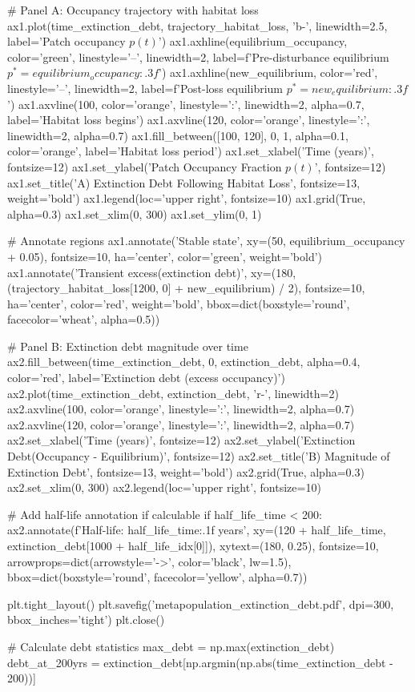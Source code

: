 \documentclass[11pt,a4paper]{article}
\begin{document}
\begin{pycode}
# Panel A: Occupancy trajectory with habitat loss
ax1.plot(time_extinction_debt, trajectory_habitat_loss, 'b-', linewidth=2.5, label='Patch occupancy $p(t)$')
ax1.axhline(equilibrium_occupancy, color='green', linestyle='--', linewidth=2,
           label=f'Pre-disturbance equilibrium $p^* = {equilibrium_occupancy:.3f}$')
ax1.axhline(new_equilibrium, color='red', linestyle='--', linewidth=2,
           label=f'Post-loss equilibrium $p^* = {new_equilibrium:.3f}$')
ax1.axvline(100, color='orange', linestyle=':', linewidth=2, alpha=0.7,
           label='Habitat loss begins')
ax1.axvline(120, color='orange', linestyle=':', linewidth=2, alpha=0.7)
ax1.fill_between([100, 120], 0, 1, alpha=0.1, color='orange', label='Habitat loss period')
ax1.set_xlabel('Time (years)', fontsize=12)
ax1.set_ylabel('Patch Occupancy Fraction $p(t)$', fontsize=12)
ax1.set_title('A) Extinction Debt Following Habitat Loss', fontsize=13, weight='bold')
ax1.legend(loc='upper right', fontsize=10)
ax1.grid(True, alpha=0.3)
ax1.set_xlim(0, 300)
ax1.set_ylim(0, 1)

# Annotate regions
ax1.annotate('Stable state', xy=(50, equilibrium_occupancy + 0.05),
            fontsize=10, ha='center', color='green', weight='bold')
ax1.annotate('Transient excess\n(extinction debt)',
            xy=(180, (trajectory_habitat_loss[1200, 0] + new_equilibrium) / 2),
            fontsize=10, ha='center', color='red', weight='bold',
            bbox=dict(boxstyle='round', facecolor='wheat', alpha=0.5))

# Panel B: Extinction debt magnitude over time
ax2.fill_between(time_extinction_debt, 0, extinction_debt, alpha=0.4, color='red',
                label='Extinction debt (excess occupancy)')
ax2.plot(time_extinction_debt, extinction_debt, 'r-', linewidth=2)
ax2.axvline(100, color='orange', linestyle=':', linewidth=2, alpha=0.7)
ax2.axvline(120, color='orange', linestyle=':', linewidth=2, alpha=0.7)
ax2.set_xlabel('Time (years)', fontsize=12)
ax2.set_ylabel('Extinction Debt\n(Occupancy - Equilibrium)', fontsize=12)
ax2.set_title('B) Magnitude of Extinction Debt', fontsize=13, weight='bold')
ax2.grid(True, alpha=0.3)
ax2.set_xlim(0, 300)
ax2.legend(loc='upper right', fontsize=10)

# Add half-life annotation if calculable
if half_life_time < 200:
    ax2.annotate(f'Half-life: {half_life_time:.1f} years',
                xy=(120 + half_life_time, extinction_debt[1000 + half_life_idx[0]]),
                xytext=(180, 0.25), fontsize=10,
                arrowprops=dict(arrowstyle='->', color='black', lw=1.5),
                bbox=dict(boxstyle='round', facecolor='yellow', alpha=0.7))

plt.tight_layout()
plt.savefig('metapopulation_extinction_debt.pdf', dpi=300, bbox_inches='tight')
plt.close()

# Calculate debt statistics
max_debt = np.max(extinction_debt)
debt_at_200yrs = extinction_debt[np.argmin(np.abs(time_extinction_debt - 200))]
\end{pycode}
\end{document}
